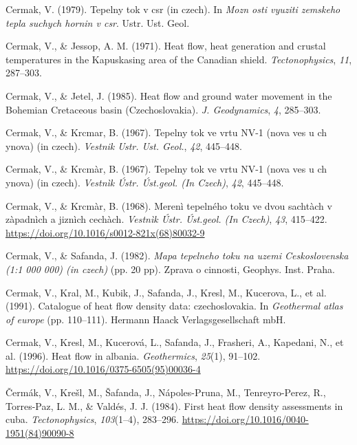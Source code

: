 \begin{CSLReferences}{1}{1}
\leavevmode{}%
Cermak, V. (1979). Tepelny tok v csr (in czech). In \emph{Mozn osti vyuziti zemskeho tepla suchych hornin v csr}. Ustr. Ust. Geol.

\leavevmode{}%
Cermak, V., \& Jessop, A. M. (1971). Heat flow, heat generation and crustal temperatures in the {Kapuskasing} area of the {Canadian shield}. \emph{Tectonophysics}, \emph{11}, 287--303.

\leavevmode{}%
Cermak, V., \& Jetel, J. (1985). Heat flow and ground water movement in the {Bohemian Cretaceous} basin {(Czechoslovakia)}. \emph{J. Geodynamics}, \emph{4}, 285--303.

\leavevmode{}%
Cermak, V., \& Krcmar, B. (1967). Tepelny tok ve vrtu NV-1 (nova ves u ch ynova) (in czech). \emph{Vestnik Ustr. Ust. Geol.}, \emph{42}, 445--448.

\leavevmode{}%
Cermak, V., \& Krcmàr, B. (1967). Tepelny tok ve vrtu NV-1 (nova ves u ch ynova) (in czech). \emph{Vestnìk Ústr. Úst.geol. (In Czech)}, \emph{42}, 445--448.

\leavevmode{}%
Cermak, V., \& Krcmàr, B. (1968). Merenì tepelného toku ve dvou sachtàch v zàpadnìch a jiznìch cechàch. \emph{Vestnìk Ústr. Úst.geol. (In Czech)}, \emph{43}, 415--422. \url{https://doi.org/10.1016/s0012-821x(68)80032-9}

\leavevmode{}%
Cermak, V., \& Safanda, J. (1982). \emph{Mapa tepelneho toku na uzemi {Ceskoslovenska} (1:1 000 000) (in czech)} (pp. 20 pp). Zprava o cinnosti, Geophys. Inst. Praha.

\leavevmode{}%
Cermak, V., Kral, M., Kubik, J., Safanda, J., Kresl, M., Kucerova, L., et al. (1991). Catalogue of heat flow density data: czechoslovakia. In \emph{Geothermal atlas of europe} (pp. 110--111). Hermann Haack Verlagsgesellschaft mbH.

\leavevmode{}%
Cermak, V., Kresl, M., Kucerová, L., Safanda, J., Frasheri, A., Kapedani, N., et al. (1996). Heat flow in albania. \emph{Geothermics}, \emph{25}(1), 91--102. \url{https://doi.org/10.1016/0375-6505(95)00036-4}

\leavevmode{}%
Čermák, V., Krešl, M., Šafanda, J., Nápoles-Pruna, M., Tenreyro-Perez, R., Torres-Paz, L. M., \& Valdés, J. J. (1984). First heat flow density assessments in cuba. \emph{Tectonophysics}, \emph{103}(1--4), 283--296. \url{https://doi.org/10.1016/0040-1951(84)90090-8}


\end{CSLReferences}
